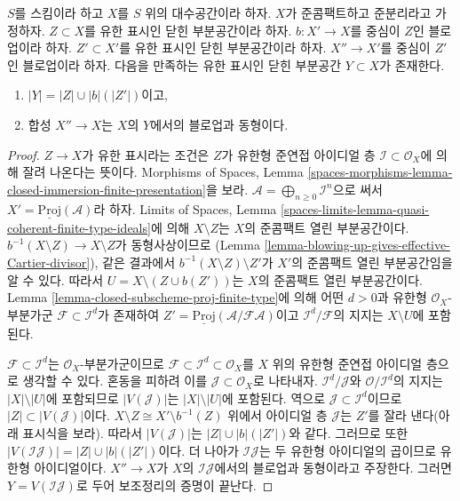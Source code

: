 \begin{lemma}
\label{lemma-composition-finite-type-blowups}
$S$를 스킴이라 하고 $X$를 $S$ 위의 대수공간이라 하자.
$X$가 준콤팩트하고 준분리라고 가정하자.
$Z \subset X$를 유한 표시인 닫힌 부분공간이라 하자.
$b : X' \to X$를 중심이 $Z$인 블로업이라 하자.
$Z' \subset X'$를 유한 표시인 닫힌 부분공간이라 하자.
$X'' \to X'$를 중심이 $Z'$인 블로업이라 하자.
다음을 만족하는 유한 표시인 닫힌 부분공간 $Y \subset X$가 존재한다.
\begin{enumerate}
\item $|Y| = |Z| \cup |b|(|Z'|)$이고,
\item 합성 $X'' \to X$는 $X$의 $Y$에서의 블로업과 동형이다.
\end{enumerate}
\end{lemma}

\begin{proof}
$Z \to X$가 유한 표시라는 조건은 $Z$가 유한형 준연접 아이디얼 층
$\mathcal{I} \subset \mathcal{O}_X$에 의해 잘려 나온다는 뜻이다.
Morphisms of Spaces, Lemma
\ref{spaces-morphisms-lemma-closed-immersion-finite-presentation}을 보라.
$\mathcal{A} = \bigoplus_{n \geq 0} \mathcal{I}^n$으로 써서
$X' = \underline{\text{Proj}}(\mathcal{A})$라 하자.
Limits of Spaces, Lemma
\ref{spaces-limits-lemma-quasi-coherent-finite-type-ideals}에 의해
$X \setminus Z$는 $X$의 준콤팩트 열린 부분공간이다.
$b^{-1}(X \setminus Z) \to X \setminus Z$가 동형사상이므로
(Lemma \ref{lemma-blowing-up-gives-effective-Cartier-divisor}), 같은 결과에서
$b^{-1}(X \setminus Z) \setminus Z'$가 $X'$의 준콤팩트 열린 부분공간임을
알 수 있다. 따라서 $U = X \setminus (Z \cup b(Z'))$는 $X$의 준콤팩트
열린 부분공간이다. Lemma \ref{lemma-closed-subscheme-proj-finite-type}에
의해 어떤 $d > 0$과 유한형 $\mathcal{O}_X$-부분가군
$\mathcal{F} \subset \mathcal{I}^d$가 존재하여
$Z' = \underline{\text{Proj}}(\mathcal{A}/\mathcal{F}\mathcal{A})$이고
$\mathcal{I}^d/\mathcal{F}$의 지지는 $X \setminus U$에 포함된다.

\medskip\noindent
$\mathcal{F} \subset \mathcal{I}^d$는 $\mathcal{O}_X$-부분가군이므로
$\mathcal{F} \subset \mathcal{I}^d \subset \mathcal{O}_X$를 $X$ 위의
유한형 준연접 아이디얼 층으로 생각할 수 있다. 혼동을 피하려 이를
$\mathcal{J} \subset \mathcal{O}_X$로 나타내자.
$\mathcal{I}^d / \mathcal{J}$와 $\mathcal{O}/\mathcal{I}^d$의 지지는
$|X| \setminus |U|$에 포함되므로 $|V(\mathcal{J})|$는
$|X| \setminus |U|$에 포함된다. 역으로
$\mathcal{J} \subset \mathcal{I}^d$이므로
$|Z| \subset |V(\mathcal{J})|$이다.
$X \setminus Z \cong X' \setminus b^{-1}(Z)$ 위에서 아이디얼 층
$\mathcal{J}$는 $Z'$를 잘라 낸다(아래 표시식을 보라). 따라서
$|V(\mathcal{J})|$는 $|Z| \cup |b|(|Z'|)$와 같다. 그러므로 또한
$|V(\mathcal{I}\mathcal{J})| = |Z| \cup |b|(|Z'|)$이다.
더 나아가 $\mathcal{I}\mathcal{J}$는 두 유한형 아이디얼의 곱이므로
유한형 아이디얼이다. $X'' \to X$가 $X$의
$\mathcal{I}\mathcal{J}$에서의 블로업과 동형이라고 주장한다. 그러면
$Y = V(\mathcal{I}\mathcal{J})$로 두어 보조정리의 증명이 끝난다.


\end{proof}
